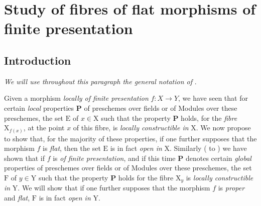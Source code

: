 
\section{Study of fibres of flat morphisms of finite presentation}
\label{section:IV.12}

\setcounter{subsection}{-1}
\subsection{Introduction}
\label{subsection:IV.12.0}

\emph{We will use throughout this paragraph the general notation of} .

\begin{env}[12.0.1]
\label{IV.12.0.1}
Given a morphism \emph{locally of finite presentation} $f:X\to Y$, we have seen  that for certain \emph{local} properties $\mathbf{P}$ of preschemes over fields or of Modules over these preschemes, the set $\mathrm{E}$ of $x\in\mathrm{X}$ such that the property $\mathbf{P}$ holds, for the \emph{fibre} $\mathrm{X}_{f(x)}$, at the point $x$ of this fibre, is \emph{locally constructible in} $\mathrm{X}$.
We now propose to show that, for the majority of these properties, if one further supposes that the morphism $f$ is \emph{flat}, then the set $\mathrm{E}$ is in fact \emph{open in} $\mathrm{X}$.
Similarly ( to ) we have shown that if $f$ is \emph{of finite presentation}, and if this time $\mathbf{P}$ denotes certain \emph{global} properties of preschemes over fields or of Modules over these preschemes, the set $\mathrm{F}$ of $y\in\mathrm{Y}$ such that the property $\mathbf{P}$ holds for the fibre $\mathrm{X}_y$ is \emph{locally constructible in} $\mathrm{Y}$.
We will show that if one further supposes that the morphism $f$ is \emph{proper} and \emph{flat}, $\mathrm{F}$ is in fact \emph{open in} $\mathrm{Y}$.
\end{env}

